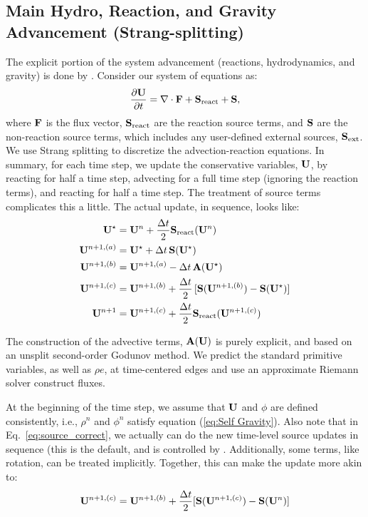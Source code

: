 \subsection{Main Hydro, Reaction, and Gravity Advancement (Strang-splitting)}

The explicit portion of the system advancement (reactions,
hydrodynamics, and gravity) is done by .  Consider
our system of equations as:
\begin{equation}
\frac{\partial{\bf U}}{\partial t} = \nabla\cdot{\bf F} + {\bf S}_{\rm react} + {\bf S},
\end{equation}
where ${\bf F}$ is the flux vector, ${\bf S}_{\rm react}$ are the reaction
source terms, and ${\bf S}$ are the non-reaction source terms, which
includes any user-defined external sources, ${\bf S}_{\rm ext}$.  We use
Strang splitting to discretize the advection-reaction equations.  In
summary, for each time step, we update the conservative variables,
${\bf U}$, by reacting for half a time step, advecting for a full time
step (ignoring the reaction terms), and reacting for half a time step.
The treatment of source terms complicates this a little.  The actual
update, in sequence, looks like:
\begin{align}
{\bf U}^\star &= {\bf U}^n + \frac{\Delta t}{2}{\bf S}_{\rm react}({\bf U}^n) \\
{\bf U}^{n+1,(a)} &= {\bf U}^\star + \Delta t\, {\bf S}({\bf U}^\star) \\
{\bf U}^{n+1,(b)} &= {\bf U}^{n+1,(a)} - \Delta t\, {\bf A}({\bf U}^\star) \\
{\bf U}^{n+1,(c)} &= {\bf U}^{n+1,(b)} + \frac{\Delta t}{2}\, [{\bf S}({\bf U}^{n+1,(b)}) - {\bf S}({\bf U}^\star)] \label{eq:source_correct}\\
{\bf U}^{n+1}     &= {\bf U}^{n+1,(c)} + \frac{\Delta t}{2} {\bf S}_{\rm react}({\bf U}^{n+1,(c)})
\end{align}

The construction of the advective terms, ${\bf A({\bf U})}$ is purely
explicit, and based on an unsplit second-order Godunov method.  We
predict the standard primitive variables, as well as $\rho e$, at
time-centered edges and use an approximate Riemann solver construct
fluxes.

At the beginning of the time step, we assume that ${\bf U}$ and $\phi$ are
defined consistently, i.e., $\rho^n$ and $\phi^n$ satisfy equation
(\ref{eq:Self Gravity}).  Also note that in
Eq.~\ref{eq:source_correct}, we actually can do the new time-level
source updates in sequence (this is the default, and is controlled by
.  Additionally, some
terms, like rotation, can be treated implicitly.  Together, this can
make the update more akin to:
\begin{equation}
{\bf U}^{n+1,(c)} = {\bf U}^{n+1,(b)} + \frac{\Delta t}{2} [{\bf S}({\bf U}^{n+1,(c)}) - {\bf S}({\bf U}^n)]
\end{equation}

